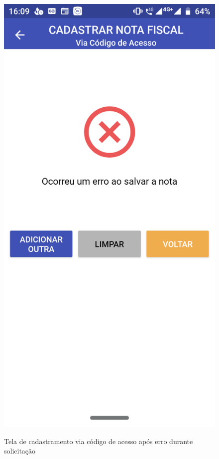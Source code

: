 \newpage
\begin{figure}[h]
    \centering
    \caption{Tela de cadastramento via código de acesso após erro durante solicitação}
    \includegraphics[scale=0.15]{tcc/figures/app/app_codigo_acesso_erro_generico.png}
    \label{appCodigoAcessoErroFig}
\end{figure}

